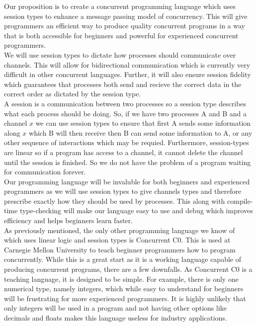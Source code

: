 \documentclass[11pt]{article}
\begin{document}
    Our proposition is to create a concurrent programming language which uses session types to enhance a 
    message passing model of concurrency. This will give programmers an efficient way to produce quality 
    concurrent programs in a way that is both accessible for beginners and powerful for experienced 
    concurrent programmers. \\

    \noindent
    We will use session types to dictate how processes should communicate over channels. This will allow 
    for bidirectional communication which is currently very difficult in other concurrent languages. Further,  
    it will also ensure session fidelity which guarantees that processes both send and recieve the correct 
    data in the correct order as dictated by the session type. \\
    
    \noindent
    A session is a communication between two processes so a session type describes what each process should 
    be doing. So, if we have two processes A and B and a channel $x$ we can use session types to ensure that 
    first A sends some information along $x$ which B will then receive then B can send some information to 
    A, or any other sequence of interactions which may be requied. Furthermore, session-types are linear so 
    if a program has access to a channel, it cannot delete the channel until the session is finished. So we 
    do not have the problem of a program waiting for communication forever.  \\

    \noindent
    Our programming language will be invaluble for both beginners and experienced programmers as we will use 
    session types to give channels types and therefore prescribe exactly how they should be used by processes. 
    This along with compile-time type-checking will make our language easy to use and debug which improves 
    efficiency and helps beginners learn faster. \\

    \noindent
    As previously mentioned, the only other programming language we know of which uses linear logic and 
    session types is Concurrent C0. This is used at Carnegie Mellon University to teach beginner programmers 
    how to program concurrently. While this is a great start as it is a working language capable of producing 
    concurrent programs, there are a few downfalls. As Concurrent C0 is a teaching language, it is designed to be simple. 
    For example, there is only one numerical type, namely integers, which while easy to understand for beginners 
    will be frustrating for more experienced programmers. It is highly unlikely that only integers will be used 
    in a program and not having other options like decimals and floats makes this language useless for industry 
    applications. \\
\end{document}
